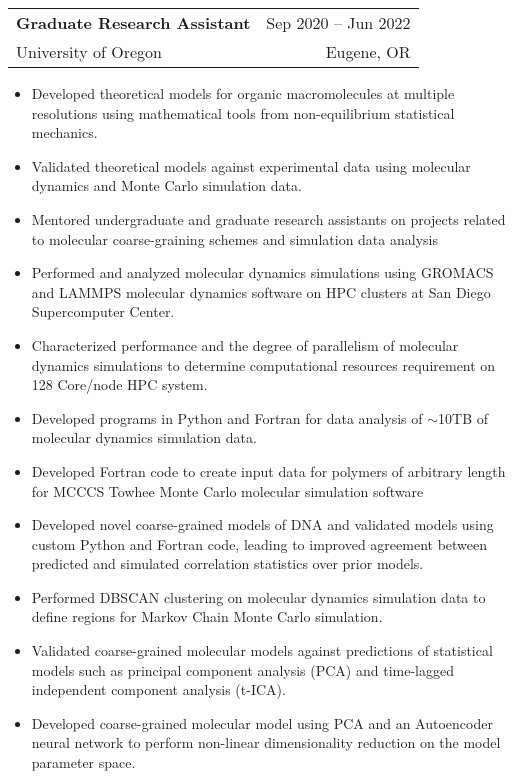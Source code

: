 \documentclass[letterpaper,10.8pt]{article}
\makeatletter
\newcommand{\resumeSubheading}[4]{
  \vspace{-1pt} \item
    \begin{tabular*}{0.97\textwidth}{l@{\extracolsep{\fill}}r}
      \textbf{#1} & #2 \\
      #3  &  #4 \\
    \end{tabular*}\vspace{-5pt}
}
\makeatother
\begin{document}
    \resumeSubheading
		{Graduate Research Assistant}{Sep 2020 – Jun 2022}
		{University of Oregon}{Eugene, OR}
	\begin{itemize}[label={$\diamond$}]
	\itemsep0em  %
	
	\item{Developed theoretical models for organic macromolecules at multiple
resolutions using mathematical tools from non-equilibrium statistical mechanics.}

	\item{Validated theoretical models against experimental data using molecular dynamics and Monte Carlo simulation data.}
	
		\item{Mentored undergraduate and graduate research assistants on projects related
to molecular coarse-graining schemes and simulation data analysis}
	
	\item{Performed and analyzed molecular dynamics simulations using GROMACS and LAMMPS molecular dynamics software on HPC clusters at San Diego Supercomputer Center.}
	
	\item{Characterized performance and the degree of parallelism of molecular dynamics simulations to determine computational resources requirement on 128 Core/node HPC system.}

	\item{Developed programs in Python and Fortran for data analysis of $\sim$10TB of molecular dynamics simulation data.}
	
	\item{Developed Fortran code to create input data for polymers of arbitrary length for MCCCS Towhee Monte Carlo molecular simulation software}

	\item{Developed novel coarse-grained models of DNA and validated models using custom Python and Fortran code, leading to improved agreement between predicted and simulated correlation statistics over prior models.}
	
	\item{Performed DBSCAN clustering on molecular dynamics simulation data to define regions for Markov Chain Monte Carlo simulation.}
	
	\item{Validated coarse-grained molecular models against predictions of statistical models such as principal component analysis (PCA) and time-lagged independent component analysis (t-ICA).}
	
	\item{Developed coarse-grained molecular model using PCA and an Autoencoder neural network to perform non-linear dimensionality reduction on the model parameter space.}
	
	\end{itemize} %
\end{document}
